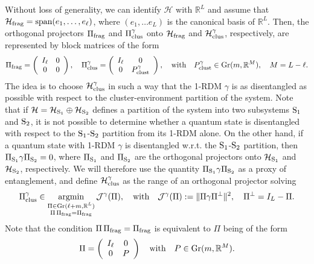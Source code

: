 \documentclass{article}
\def\R{\mathbb R}
\newcommand{\1}{{\mathds 1}}
\begin{document}
Without loss of generality, we can identify ${\mathcal H}$ with $\R^L$  and assume that $\mathcal{H}_{\rm frag} = \text{span}(e_1, \dots, e_\ell)$, where $(e_1, \dots e_L)$ is the canonical basis of $\R^L$. Then, the orthogonal projectors $\Pi_{\rm frag}$ and $\Pi_{\rm clus}^\gamma$ onto $\mathcal{H}_{\rm frag}$ and $\mathcal H_{{\rm clus}}^\gamma$, respectively, are represented by block matrices of the form
\begin{equation}\label{eq:PfPc}
\Pi_{\rm frag}=\left( \begin{array}{cc} I_\ell & 0  \\ 0 & 0 \end{array} \right), \quad 
\Pi_{\rm clus}^\gamma=\left( \begin{array}{cc} I_{\ell} & 0  \\ 0 & P_{\rm clust}^{\gamma} \end{array} \right), \quad \mbox{with} \quad P_{\rm clust}^{\gamma} \in {\rm Gr}(m,\R^M), \quad M=L-\ell.
\end{equation}
The idea is to choose $\mathcal H_{{\rm clus}}^\gamma$ in such a way that the 1-RDM $\gamma$ is as disentangled as possible with respect to the cluster-environment partition of the system. Note that if $\mathcal H=\mathcal H_{\rm S_1} \oplus \mathcal H_{\rm S_2}$ defines a partition of the system into two subsystems $\rm S_1$ and $\rm S_2$, it is not possible to determine whether a quantum state is disentangled with respect to the $\rm S_1$-$\rm S_2$ partition from its 1-RDM alone. On the other hand, if a quantum state with 1-RDM $\gamma$ is disentangled w.r.t. the $\rm S_1$-$\rm S_2$ partition, then $\Pi_{{\rm S_1}} \gamma \Pi_{{\rm S_2}}=0$, where $\Pi_{\rm S_1}$ and $\Pi_{\rm S_2}$ are the orthogonal projectors onto $\mathcal H_{\rm S_1}$ and $\mathcal H_{\rm S_2}$, respectively. We will therefore use the quantity $\Pi_{{\rm S_1}} \gamma \Pi_{{\rm S_2}}$ as a proxy of entanglement, and define $\mathcal H_{{\rm clus}}^\gamma$ as the range of an orthogonal projector solving
\begin{align} \label{eq:opt_Pi}
\Pi_{\rm clus}^\gamma \in \mathop{\rm argmin}_{
\substack{\Pi \in {\rm Gr}(\ell+m,\R^L) \\ \Pi\,\Pi_{\rm frag}=\Pi_{\rm frag}}
}  \mathcal J^\gamma(\Pi), \quad \mbox{with} \quad \mathcal J^\gamma(\Pi):=\|\Pi\gamma\Pi^\perp\|^2, \quad \Pi^\perp=I_L-\Pi.
\end{align}
Note that the condition $\Pi\,\Pi_{\rm frag}=\Pi_{\rm frag}$ is equivalent to $\Pi$ being of the form 
\begin{equation}\label{eq:Pi_P}
\Pi=\left( \begin{array}{cc} I_{\ell} & 0  \\ 0 & P \end{array} \right) \quad \mbox{with} \quad  P \in {\rm Gr}(m,\R^M).
\end{equation}
\end{document}

